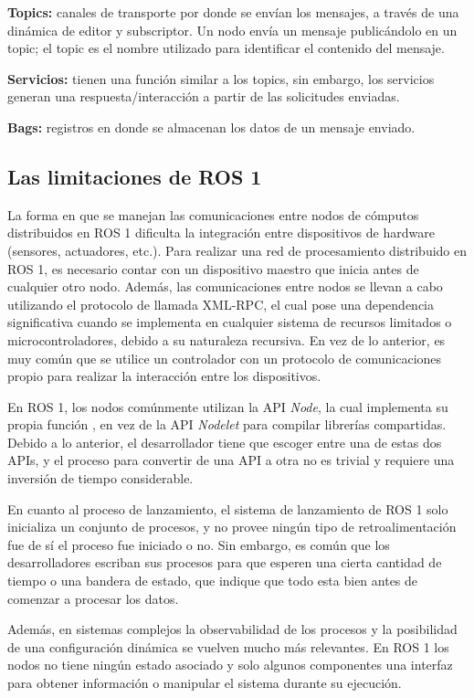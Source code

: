 \textbf{Topics:} canales de transporte por donde se envían los mensajes, a través de una dinámica de editor y subscriptor. Un nodo envía un mensaje publicándolo en un topic; el topic es el nombre utilizado para identificar el contenido del mensaje.

\textbf{Servicios:} tienen una función similar a los topics, sin embargo, los servicios generan una respuesta/interacción a partir de las solicitudes enviadas.

\textbf{Bags:} registros en donde se almacenan los datos de un mensaje enviado.

\subsection{Las limitaciones de ROS 1}

La forma en que se manejan las comunicaciones entre nodos de cómputos distribuidos en ROS 1 dificulta la integración entre dispositivos de hardware (sensores, actuadores, etc.). Para realizar una red de procesamiento distribuido en ROS 1, es necesario contar con un dispositivo maestro que inicia antes de cualquier otro nodo. Además, las comunicaciones entre nodos se llevan a cabo utilizando el protocolo de llamada XML-RPC, el cual pose una dependencia significativa cuando se implementa en cualquier sistema de recursos limitados o microcontroladores, debido a su naturaleza recursiva. En vez de lo anterior, es muy común que se utilice un controlador con un protocolo de comunicaciones propio para realizar la interacción entre los dispositivos.

En ROS 1, los nodos comúnmente utilizan la API \textit{Node}, la cual implementa su propia función , en vez de la API \textit{Nodelet} para compilar librerías compartidas. Debido a lo anterior, el desarrollador tiene que escoger entre una de estas dos APIs, y el proceso para convertir de una API a otra no es trivial y requiere una inversión de tiempo considerable.

En cuanto al proceso de lanzamiento, el sistema de lanzamiento de ROS 1 solo inicializa un conjunto de procesos, y no provee ningún tipo de retroalimentación fue de sí el proceso fue iniciado o no. Sin embargo, es común que los desarrolladores escriban sus procesos para que esperen una cierta cantidad de tiempo o una bandera de estado, que indique que todo esta bien antes de comenzar a procesar los datos. 

Además, en sistemas complejos la observabilidad de los procesos y la posibilidad de una configuración dinámica se vuelven mucho más relevantes. En ROS 1 los nodos no tiene ningún estado asociado y solo algunos componentes una interfaz para obtener información o manipular el sistema durante su ejecución.  
   
